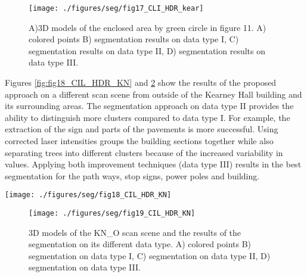 \documentclass[final,3p,times,twocolumn,authoryear]{elsarticle}
\begin{document}
\begin{figure}[h]
	\centering
	\texttt{[image: ./figures/seg/fig17\_CLI\_HDR\_kear]}
	\caption{ A)3D models of the enclosed area by green circle in figure 11. A) colored points B) segmentation results on data type I, C) segmentation results on data type II, D) segmentation results on data type III.}
	\label{fig:fig17_CLI_HDR_kear}
\end{figure}

Figures \ref{fig:fig18_CIL_HDR_KN} and \ref{fig:fig19_CIL_HDR_KN} show the results of the proposed approach on a different scan scene from outside of the Kearney Hall building and its surrounding areas. The segmentation approach on data type II provides the ability to distinguish more clusters compared to data type I. For example, the extraction of the sign and parts of the pavements is more successful. Using corrected laser intensities groups the building sections together while also separating trees into different clusters because of the increased variability in values.  Applying both improvement techniques (data type III) results in the best segmentation for the path ways, stop signs, power poles and building. 

\begin{figure*}
	\texttt{[image: ./figures/seg/fig18\_CIL\_HDR\_KN]}
	\caption{A) RGB PIMP for the KN\_O scan scene. The influence of data improvement techniques on the KN\_O scan scene are shown for data types I (B), II (C), and III (D).}
	\label{fig:fig18_CIL_HDR_KN}
\end{figure*}

\begin{figure}[h]
	\centering
	\texttt{[image: ./figures/seg/fig19\_CIL\_HDR\_KN]}
	\caption{3D models of the KN\_O scan scene and the results of the segmentation on its different data type. A) colored points B) segmentation on data type I, C) segmentation on data type II, D) segmentation on data type III.}
	\label{fig:fig19_CIL_HDR_KN}
\end{figure}
\end{document}
